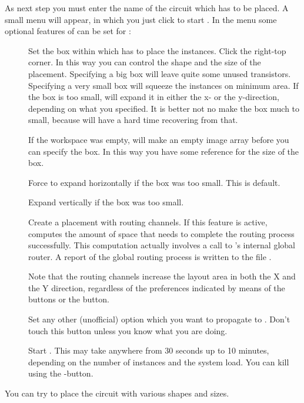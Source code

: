 As next step you must enter the name of the circuit which
has to be placed. A small menu will appear, in which you
just click  to start .
In the menu some optional features of can be set for :
\begin{description}
\item[]
Set the box within which  has to place the instances.  Click the
right-top corner. In this way you can control the shape and the size of the
placement. Specifying a big box will leave quite some unused transistors.
Specifying a very small box will squeeze the instances on minimum area. If the
box is too small,  will expand it in either the x- or the y-direction,
depending on what you specified. It is better not no make the box much to
small, because  will have a hard time recovering from that.

If the workspace was empty,  will make an empty image array
before you can specify the box. In this way you have some reference for the
size of the box.
\item[]
Force  to expand horizontally if the box was too small.
This is default.
\item[]
Expand vertically if the box was too small.
\item[]
Create a placement with routing channels. If this feature is active,
 computes the amount of space that  needs 
to complete the routing process successfully. This computation actually
involves a call to
's internal global router. A report of the global routing
process is written to the file .

Note that the routing channels increase the layout area in both the X and the Y
direction, regardless of the preferences indicated by means of the
 buttons or the  button.
\item[]
Set any other (unofficial) option which you want to propagate to
. Don't touch this button unless you know what you are
doing. 
\item[]
Start . This may take anywhere from 30 seconds up to
10 minutes, depending
on the number of instances and the system load. You can kill 
using the -button.
\end{description}
You can try to place the circuit with various shapes and sizes.

